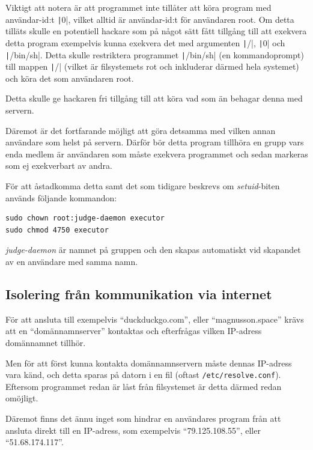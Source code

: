 \documentclass{article}
\begin{document}
Viktigt att notera är att programmet inte tillåter att köra program med
användar-id:t \texttt|0|, vilket alltid är användar-id:t för användaren root. Om
detta tilläts skulle en potentiell hackare som på något sätt fått tillgång till
att exekvera detta program exempelvis kunna exekvera det med argumenten
\texttt|/|,
\texttt|0| och
\texttt|/bin/sh|.
Detta skulle restriktera programmet
\texttt|/bin/sh|
(en kommandoprompt) till mappen \texttt|/| (vilket är filsystemets rot och
inkluderar därmed hela systemet) och köra det som användaren root.

Detta skulle ge hackaren fri tillgång till att köra vad som än behagar denna med
servern.

Däremot är det fortfarande möjligt att göra detsamma med vilken annan användare
som helst på servern. Därför bör detta program tillhöra en grupp vars enda
medlem är användaren som måste exekvera programmet och sedan markeras som ej
exekverbart av andra.

För att åstadkomma detta samt det som tidigare beskrevs om \textit{setuid}-biten
används följande kommandon:

\begin{verbatim}
sudo chown root:judge-daemon executor
sudo chmod 4750 executor
\end{verbatim}

\textit{judge-daemon} är namnet på gruppen och den skapas automatiskt vid
skapandet av en användare med samma namn.

\subsection{Isolering från kommunikation via internet}

För att ansluta till exempelvis ``duckduckgo.com'', eller ``magnusson.space''
krävs att en ``domännamnserver'' kontaktas och efterfrågas vilken IP-adress
domännamnet tillhör.

Men för att först kunna kontakta domännamnservern måste dennas IP-adress vara
känd, och detta sparas på datorn i en fil (oftast \texttt{/etc/resolve.conf}).
Eftersom programmet redan är låst från filsystemet är detta därmed redan
omöjligt.

Däremot finns det ännu inget som hindrar en användares program från att ansluta
direkt till en IP-adress, som exempelvis ``79.125.108.55'', eller \\
``51.68.174.117''.
\end{document}
